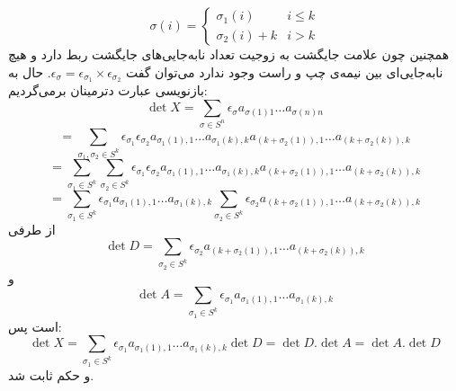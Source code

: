 \documentclass[12pt,a4paper]{article}
\begin{document}
$$\sigma(i) = \begin{cases}
\sigma_1(i)&i \leq k \\
\sigma_2(i)+k&i > k
\end{cases}$$
همچنین چون علامت جایگشت به زوجیت تعداد نابه‌جایی‌های جایگشت ربط دارد و هیچ نابه‌جایی‌ای بین نیمه‌ی چپ و راست وجود ندارد می‌توان گفت
$\epsilon_\sigma = \epsilon_{\sigma_1} \times \epsilon_{\sigma_2}$.
حال به بازنویسی عبارت دترمینان برمی‌گردیم:
$$\det X = \sum_{\sigma \in S^n} \epsilon_\sigma a_{\sigma(1)1}\dots a_{\sigma(n)n}
$$$$
 = \sum_{\sigma_1, \sigma_2 \in S^k} \epsilon_{\sigma_1}\epsilon_{\sigma_2} a_{\sigma_1(1) , 1}\dots a_{\sigma_1(k) , k} a_{(k+\sigma_2(1)) , 1}\dots a_{(k+\sigma_2(k)) , k}
$$
$$
= \sum_{\sigma_1 \in S^k} \sum_{\sigma_2 \in S^k} \epsilon_{\sigma_1}\epsilon_{\sigma_2} a_{\sigma_1(1) , 1}\dots a_{\sigma_1(k) , k} a_{(k+\sigma_2(1)) , 1}\dots a_{(k+\sigma_2(k)) , k}
$$
$$
= \sum_{\sigma_1 \in S^k} \epsilon_{\sigma_1} a_{\sigma_1(1) , 1}\dots a_{\sigma_1(k) , k} \sum_{\sigma_2 \in S^k} \epsilon_{\sigma_2} a_{(k+\sigma_2(1)) , 1}\dots a_{(k+\sigma_2(k)) , k}
$$
از طرفی 
$$\det D = \sum_{\sigma_2 \in S^k} \epsilon_{\sigma_2} a_{(k+\sigma_2(1)) , 1}\dots a_{(k+\sigma_2(k)) , k}$$
و
$$\det A = \sum_{\sigma_1 \in S^k} \epsilon_{\sigma_1} a_{\sigma_1(1) , 1}\dots a_{\sigma_1(k) , k}$$
است پس:
$$
\det X = \sum_{\sigma_1 \in S^k} \epsilon_{\sigma_1} a_{\sigma_1(1) , 1}\dots a_{\sigma_1(k) , k} \det D = \det D . \det A = \det A . \det D
$$
و حکم ثابت شد.
\end{document}
